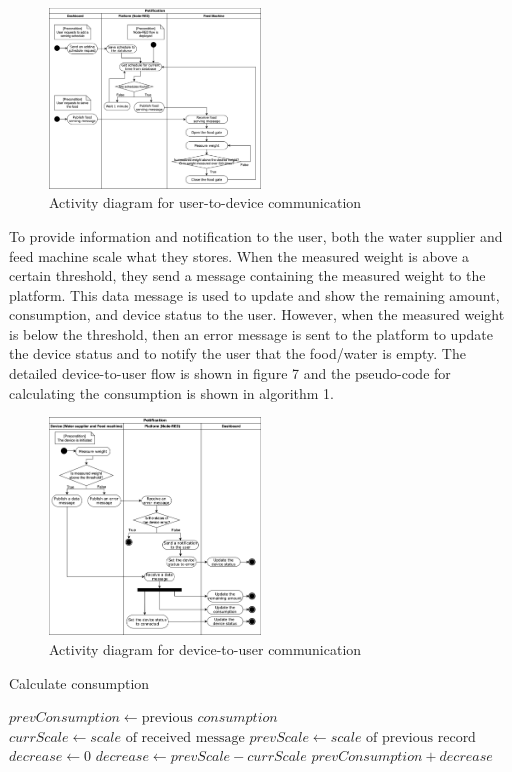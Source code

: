 \documentclass[conference]{IEEEtran}
\begin{document}
\begin{figure}[htbp]
\centerline{\includegraphics[width=0.5\textwidth]{./images/user2device.png}}
\caption{Activity diagram for user-to-device communication}
\label{fig}
\end{figure}

To provide information and notification to the user, both the water supplier and feed machine scale what they stores.
When the measured weight is above a certain threshold, they send a message containing the measured weight to the platform.
This data message is used to update and show the remaining amount, consumption, and device status to the user.
However, when the measured weight is below the threshold, then an error message is sent to the platform to update the device status and to notify the user that the food/water is empty.
The detailed device-to-user flow is shown in figure 7 and the pseudo-code for calculating the consumption is shown in algorithm 1.

\begin{figure}[htbp]
\centerline{\includegraphics[width=0.5\textwidth]{./images/device2user.png}}
\caption{Activity diagram for device-to-user communication}
\label{fig}
\end{figure}

\begin{algorithm}
\caption{Calculate consumption}\label{algo}
\begin{algorithmic}[1]
        \State $prevConsumption \gets \text{previous } \textit{consumption}$
        \State $currScale \gets \textit{scale} \text{ of received message}$
        \State $prevScale \gets \textit{scale} \text{ of  previous record}$
        \State $decrease \gets 0$
            \State $decrease \gets prevScale - currScale$
        \EndIf
        \Return $prevConsumption + decrease$
    \EndProcedure
\end{algorithmic}
\end{algorithm}
\end{document}
